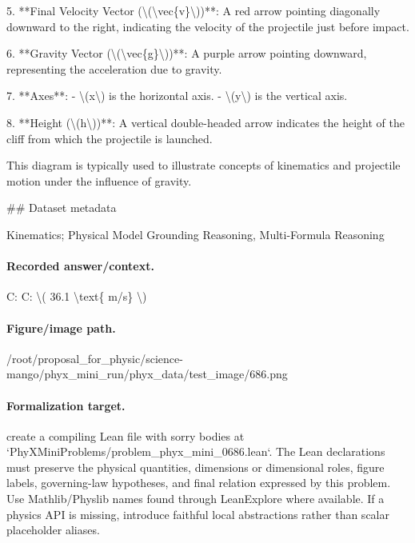 5. **Final Velocity Vector (\textbackslash{}(\textbackslash{}vec\{v\}\textbackslash{}))**: A red arrow pointing diagonally downward to the right, indicating the velocity of the projectile just before impact.

6. **Gravity Vector (\textbackslash{}(\textbackslash{}vec\{g\}\textbackslash{}))**: A purple arrow pointing downward, representing the acceleration due to gravity.

7. **Axes**:
   - \textbackslash{}(x\textbackslash{}) is the horizontal axis.
   - \textbackslash{}(y\textbackslash{}) is the vertical axis.

8. **Height (\textbackslash{}(h\textbackslash{}))**: A vertical double-headed arrow indicates the height of the cliff from which the projectile is launched.

This diagram is typically used to illustrate concepts of kinematics and projectile motion under the influence of gravity.

\#\# Dataset metadata

Kinematics; Physical Model Grounding Reasoning, Multi-Formula Reasoning

\paragraph{Recorded answer/context.}
C: C: \textbackslash{}( 36.1 \textbackslash{}text\{ m/s\} \textbackslash{})

\paragraph{Figure/image path.}
/root/proposal\_for\_physic/science-mango/phyx\_mini\_run/phyx\_data/test\_image/686.png

\paragraph{Formalization target.}
create a compiling Lean file with sorry bodies at `PhyXMiniProblems/problem\_phyx\_mini\_0686.lean`. The Lean declarations must preserve the physical quantities, dimensions or dimensional roles, figure labels, governing-law hypotheses, and final relation expressed by this problem.
Use Mathlib/Physlib names found through LeanExplore where available. If a physics API is missing, introduce faithful local abstractions rather than scalar placeholder aliases.

